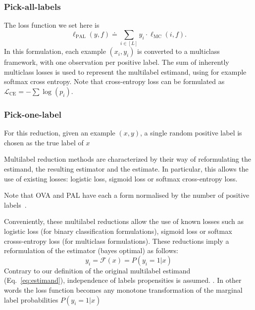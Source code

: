 \subsubsection*{Pick-all-labels}
The loss function we set here is
%
\begin{equation}
\ell_{\mathrm{PAL}}(y, f) \doteq \sum_{i \in[L]} y_{i} \cdot \ell_{\mathrm{MC}}(i, f).
\end{equation}
%
In this formulation, each example $(x_i, y_i)$ is converted to a multiclass framework, with one observation per positive label. The sum of inherently multiclass losses is used to represent the multilabel estimand, using for example softmax cross entropy. Note that cross-entropy loss can be formulated as \(\mathcal{L}_{\text {CE}}=-\sum \log \left(p_{i}\right)\).

\subsubsection*{Pick-one-label}

For this reduction, given an example $(x,y)$, a single random positive label is chosen as the true label of $x$

\vspace{\baselineskip}

Multilabel reduction methods are characterized by their way of reformulating the estimand, the resulting estimator and the estimate. In particular, this allows the use of existing losses: logistic loss, sigmoid loss or softmax cross-entropy loss.

Note that OVA and PAL have each a form normalised by the number of positive labels~\cite{multilabelReduction}.

Conveniently, these multilabel reductions allow the use of known losses such as logistic loss (for binary classification formulations), sigmoid loss or softmax crosss-entropy loss (for multiclass formulations). These reductions imply a reformulation of the estimator (bayes optimal) as follows:
%
\begin{equation}
  y_i = \mathcal{F}(x) = P(y_i = 1 | x)
\end{equation}
%
Contrary to our definition of the original multilabel estimand (Eq.~\ref{eq:estimand}), independence of labels propensities is assumed. . In other words the loss function becomes any monotone transformation of the marginal label probabilities $ P(y_i = 1 | x)$ ~\cite{OVA2, multilabelMetrics, unifiedView}

